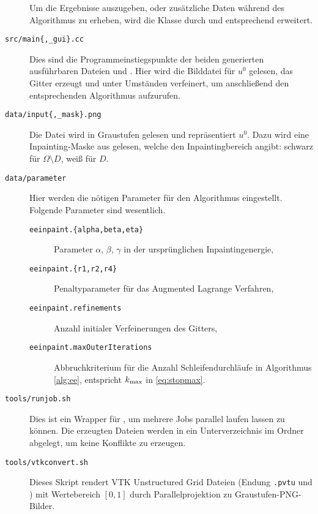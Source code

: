 \documentclass{mythesis}
\begin{document}
\begin{description}
	Um die Ergebnisse auszugeben, oder zusätzliche Daten während des Algorithmus zu erheben, wird die Klasse durch  und  entsprechend erweitert.
    \item[\texttt{src/main\{,_gui\}.cc}]
	Dies sind die Programmeinstiegspunkte der beiden generierten ausführbaren Dateien  und .
	Hier wird die Bilddatei für $u^0$ gelesen, das Gitter erzeugt und unter Umständen verfeinert, um anschließend den entsprechenden Algorithmus aufzurufen.
   \item[\texttt{data/input\{,_mask\}.png}]
	Die Datei  wird in Graustufen gelesen und repräsentiert $u^0$.
	Dazu wird eine Inpainting-Maske aus  gelesen, welche den Inpaintingbereich angibt: schwarz für $\Omega \setminus D$, weiß für $D$.
    \item[\texttt{data/parameter}]
	Hier werden die nötigen Parameter für den Algorithmus eingestellt.
	Folgende Parameter sind wesentlich.
	\begin{description}
	    \item[\texttt{eeinpaint.\{alpha,beta,eta\}}]
		Parameter $\alpha$, $\beta$, $\gamma$ in der ursprünglichen Inpaintingenergie,
	    \item[\texttt{eeinpaint.\{r1,r2,r4\}}]
		Penaltyparameter für das Augmented Lagrange Verfahren,
	    \item[\texttt{eeinpaint.refinements}]
		Anzahl initialer Verfeinerungen des Gitters,
	    \item[\texttt{eeinpaint.maxOuterIterations}]
		Abbruchkriterium für die Anzahl Schleifendurchläufe in Algorithmus \ref{alg:ee}, entspricht $k_{\mathrm{max}}$ in \eqref{eq:stopmax}.
	\end{description}
    \item[\texttt{tools/runjob.sh}]
	Dies ist ein Wrapper für , um mehrere Jobs parallel laufen lassen zu können.
	Die erzeugten Dateien werden in ein Unterverzeichnis im Ordner  abgelegt, um keine Konflikte zu erzeugen.
    \item[\texttt{tools/vtkconvert.sh}]
	Dieses Skript rendert VTK Unstructured Grid Dateien (Endung \texttt{.pvtu} und ) mit Wertebereich $[0,1]$ durch Parallelprojektion zu Graustufen-PNG-Bilder.
\end{description}
\end{document}
